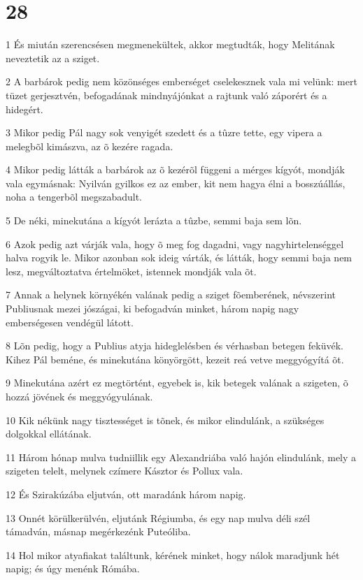 \chapter{28}

\par 1 És miután szerencsésen megmenekültek, akkor megtudták, hogy Melitának neveztetik az a sziget.
\par 2 A barbárok pedig nem közönséges emberséget cselekesznek vala mi velünk: mert tüzet gerjesztvén, befogadának mindnyájónkat a rajtunk való záporért és a hidegért.
\par 3 Mikor pedig Pál nagy sok venyigét szedett és a tûzre tette, egy vipera a melegbõl kimászva, az õ kezére ragada.
\par 4 Mikor pedig látták a barbárok az õ kezérõl függeni a mérges kígyót, mondják vala egymásnak: Nyilván gyilkos ez az ember, kit nem hagya élni a bosszúállás, noha a tengerbõl megszabadult.
\par 5 De néki, minekutána a kígyót lerázta a tûzbe, semmi baja sem lõn.
\par 6 Azok pedig azt várják vala, hogy õ meg fog dagadni, vagy nagyhirtelenséggel halva rogyik le. Mikor azonban sok ideig várták, és látták, hogy semmi baja nem lesz, megváltoztatva értelmöket, istennek mondják vala õt.
\par 7 Annak a helynek környékén valának pedig a sziget fõemberének, névszerint Publiusnak mezei jószágai, ki befogadván minket, három napig nagy emberségesen vendégül látott.
\par 8 Lõn pedig, hogy a Publius atyja hideglelésben és vérhasban betegen feküvék. Kihez Pál beméne, és minekutána  könyörgött, kezeit reá vetve meggyógyítá õt.
\par 9 Minekutána azért ez megtörtént, egyebek is, kik betegek valának a szigeten, õ hozzá jövének és meggyógyulának.
\par 10 Kik nékünk nagy tisztességet is tõnek, és mikor elindulánk, a szükséges dolgokkal ellátának.
\par 11 Három hónap mulva tudniillik egy Alexandriába való hajón elindulánk, mely a szigeten telelt, melynek czímere Kásztor és Pollux vala.
\par 12 És Szirakúzába eljutván, ott maradánk három napig.
\par 13 Onnét körülkerülvén, eljutánk Régiumba, és egy nap mulva déli szél támadván, másnap megérkezénk Puteóliba.
\par 14 Hol mikor atyafiakat találtunk, kérének minket, hogy nálok maradjunk hét napig; és úgy menénk Rómába.
